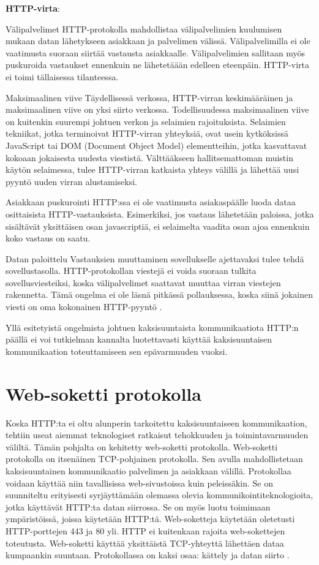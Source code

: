\documentclass[utf8]{gradu3}
\begin{document}
\textbf{HTTP-virta}:
\begin{desclist}
\item[Välipalvelimet] HTTP-protokolla mahdollistaa välipalvelimien kuulumisen mukaan datan lähetykseen asiakkaan ja palvelimen välissä. Välipalvelimilla ei ole vaatimusta suoraan siirtää vastausta asiakkaalle. Välipalvelimien sallitaan myös puskuroida vastaukset ennenkuin ne lähetetäään edelleen eteenpäin. HTTP-virta ei toimi tällaisessa tilanteessa.
\item[Maksimaalinen viive] Täydellisessä verkossa, HTTP-virran keskimääräinen ja maksimaalinen viive on yksi siirto verkossa. Todellisuudessa maksimaalinen viive on kuitenkin suurempi johtuen verkon ja selaimien rajoituksista. Selaimien tekniikat, jotka terminoivat HTTP-virran yhteyksiä, ovat usein kytköksissä JavaScript tai DOM (Document Object Model) elementteihin, jotka kasvattavat kokoaan jokaisesta uudesta viestistä. Välttääkseen hallitsemattoman muistin käytön selaimessa, tulee HTTP-virran katkaista yhteys välillä ja lähettää uusi pyyntö uuden virran alustamiseksi.
\item[Asiakkaan puskurointi] HTTP:ssa ei ole vaatimusta asiakaspäälle luoda dataa osittaisista  HTTP-vastauksista. Esimerkiksi, jos vastaus lähetetään paloissa, jotka sisältävät yksittäisen osan javascriptiä, ei selaimelta vaadita osan ajoa ennenkuin koko vastaus on saatu.
\item[Datan paloittelu] Vastauksien muuttaminen sovellukselle ajettavaksi tulee tehdä sovellustasolla. HTTP-protokollan viestejä ei voida suoraan tulkita sovellusviesteiksi, koska välipalvelimet saattavat muuttaa virran viestejen rakennetta. Tämä ongelma ei ole läsnä pitkässä pollauksessa, koska siinä jokainen viesti on oma kokonainen HTTP-pyyntö \parencite[s. 2]{long_polling}. 
\end{desclist}

Yllä esitetyistä ongelmista johtuen kaksisuuntaista kommunikaatiota HTTP:n päällä ei voi tutkielman kannalta luotettavasti käyttää kaksisuuntaisen kommunikaation toteuttamiseen sen epävarmuuden vuoksi.



\section{Web-soketti protokolla}
Koska HTTP:ta ei oltu alunperin tarkoitettu kaksisuuntaiseen kommunikaation, tehtiin useat aiemmat teknologiset ratkaisut tehokkuuden ja toimintavarmuuden väliltä. Tämän pohjalta on kehitetty web-soketti protokolla. Web-soketti protokolla on itsenäinen TCP-pohjainen protokolla. Sen avulla mahdollistetaan kaksisuuntainen kommunikaatio palvelimen ja asiakkaan välillä. Protokollaa voidaan käyttää niin tavallisissa web-sivustoissa kuin peleissäkin.  Se on suunniteltu erityisesti syrjäyttämään olemassa olevia kommunikointiteknologioita, jotka käyttävät HTTP:ta datan siirrossa. Se on myös luotu toimimaan ympäristöissä, joissa käytetään HTTP:tä. Web-soketteja käytetään oletetusti  HTTP-porttejen 443 ja 80 yli. HTTP ei kuitenkaan rajoita web-sokettejen toteutusta.  Web-soketti käyttää yksittäistä TCP-yhteyttä lähettäen dataa kumpaankin suuntaan. Protokollassa on kaksi osaa: kättely ja datan siirto \parencite[s. 1.1]{websocket}.
\end{document}
